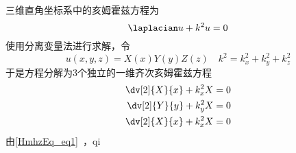 三维直角坐标系中的亥姆霍兹方程为
\begin{equation}
\laplacian u+k^2u=0
\end{equation}
使用分离变量法进行求解，令
\begin{equation}
u(x,y,z)=X(x)Y(y)Z(z)\quad
k^2=k_x^2+k_y^2+k_z^2
\end{equation}
于是方程分解为3个独立的一维齐次亥姆霍兹方程
\begin{equation}
\begin{aligned}
\dv[2]{X}{x}+k_x^2X=0\\
\dv[2]{Y}{y}+k_y^2X=0\\
\dv[2]{X}{x}+k_x^2X=0
\end{aligned}
\end{equation}
由\autoref{HmhzEq_eq1}~，qi